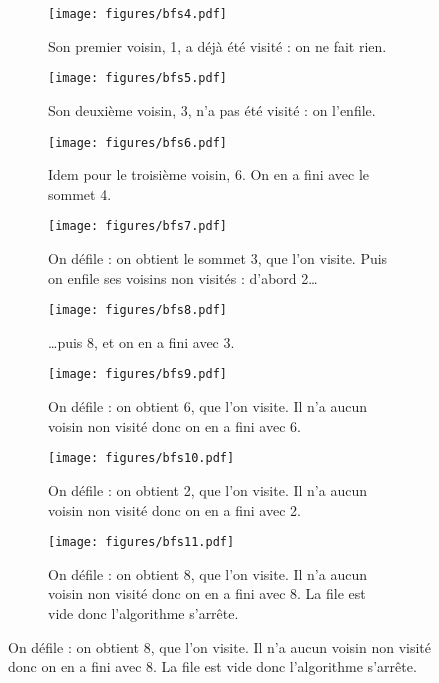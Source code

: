 \documentclass{article}
\begin{document}
\begin{itemize}
\begin{figure}[b]
		\begin{subfigure}[t]{0.3\linewidth}
			\centering
			\texttt{[image: figures/bfs4.pdf]}
			\caption{Son premier voisin, 1, a déjà été visité : on ne fait rien.}
		\end{subfigure}\hfill%
		\begin{subfigure}[t]{0.3\linewidth}
			\centering
			\texttt{[image: figures/bfs5.pdf]}
			\caption{Son deuxième voisin, 3, n'a pas été visité : on l'enfile.}
		\end{subfigure}\hfill%
		\begin{subfigure}[t]{0.3\linewidth}
			\centering
			\texttt{[image: figures/bfs6.pdf]}
			\caption{Idem pour le troisième voisin, 6. On en a fini avec le sommet 4.}
		\end{subfigure}
	
		\begin{subfigure}[t]{0.3\linewidth}
			\centering
			\texttt{[image: figures/bfs7.pdf]}
			\caption{On défile : on obtient le sommet 3, que l'on visite. Puis on enfile ses voisins non visités : d'abord 2\ldots}
		\end{subfigure}\hfill%
		\begin{subfigure}[t]{0.3\linewidth}
			\centering
			\texttt{[image: figures/bfs8.pdf]}
			\caption{\ldots puis 8, et on en a fini avec 3.}
		\end{subfigure}\hfill%
		\begin{subfigure}[t]{0.3\linewidth}
			\centering
			\texttt{[image: figures/bfs9.pdf]}
			\caption{On défile : on obtient 6, que l'on visite. Il n'a aucun voisin non visité donc on en a fini avec 6.}
		\end{subfigure}
	
		\begin{subfigure}[t]{0.45\linewidth}
			\centering
			\texttt{[image: figures/bfs10.pdf]}
			\caption{On défile : on obtient 2, que l'on visite. Il n'a aucun voisin non visité donc on en a fini avec 2.}
		\end{subfigure}\hfill%
		\begin{subfigure}[t]{0.45\linewidth}
			\centering
			\texttt{[image: figures/bfs11.pdf]}
			\caption{On défile : on obtient 8, que l'on visite. Il n'a aucun voisin non visité donc on en a fini avec 8. La file est vide donc l'algorithme s'arrête.}
		\end{subfigure}
	\end{figure}
\end{itemize}
\end{document}
